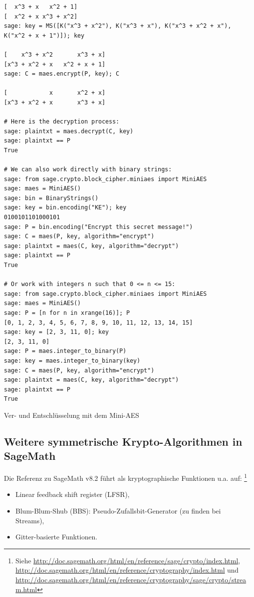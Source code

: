 \begin{refsegment}
\begin{sagecode}
\begin{Verbatim}
[  x^3 + x   x^2 + 1]
[  x^2 + x x^3 + x^2]
sage: key = MS([K("x^3 + x^2"), K("x^3 + x"), K("x^3 + x^2 + x"), K("x^2 + x + 1")]); key

[    x^3 + x^2       x^3 + x]
[x^3 + x^2 + x   x^2 + x + 1]
sage: C = maes.encrypt(P, key); C

[            x       x^2 + x]
[x^3 + x^2 + x       x^3 + x]

# Here is the decryption process:
sage: plaintxt = maes.decrypt(C, key)
sage: plaintxt == P
True

# We can also work directly with binary strings:
sage: from sage.crypto.block_cipher.miniaes import MiniAES
sage: maes = MiniAES()
sage: bin = BinaryStrings()
sage: key = bin.encoding("KE"); key
0100101101000101
sage: P = bin.encoding("Encrypt this secret message!")
sage: C = maes(P, key, algorithm="encrypt")
sage: plaintxt = maes(C, key, algorithm="decrypt")
sage: plaintxt == P
True

# Or work with integers n such that 0 <= n <= 15:
sage: from sage.crypto.block_cipher.miniaes import MiniAES
sage: maes = MiniAES()
sage: P = [n for n in xrange(16)]; P
[0, 1, 2, 3, 4, 5, 6, 7, 8, 9, 10, 11, 12, 13, 14, 15]
sage: key = [2, 3, 11, 0]; key
[2, 3, 11, 0]
sage: P = maes.integer_to_binary(P)
sage: key = maes.integer_to_binary(key)
sage: C = maes(P, key, algorithm="encrypt")
sage: plaintxt = maes(C, key, algorithm="decrypt")
sage: plaintxt == P
True
\end{Verbatim}
\caption{Ver- und Entschlüsselung mit dem Mini-AES}
\label{cm_Mini-AES:Sage_example}
\end{sagecode}
\clearpage%


\subsection{Weitere symmetrische Krypto-Algorithmen in SageMath}
\label{CM_Sage_SymCryptoAlg}

Die Referenz zu SageMath v8.2 führt als kryptographische Funktionen u.a. auf:%
\footnote{
  Siehe
  \url{http://doc.sagemath.org/html/en/reference/sage/crypto/index.html},\\
  \url{http://doc.sagemath.org/html/en/reference/cryptography/index.html} und\\
  \url{http://doc.sagemath.org/html/en/reference/cryptography/sage/crypto/stream.html}
}
\begin{itemize}
   \item Linear feedback shift register (LFSR),
   \item Blum-Blum-Shub (BBS): Pseudo-Zufallsbit-Generator (zu finden bei Streams),
   \item Gitter-basierte Funktionen.
\end{itemize}




\end{refsegment}
